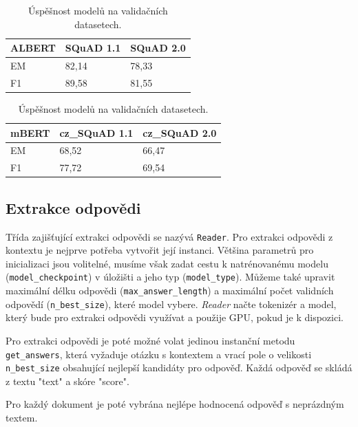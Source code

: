 \begin{table}[h]
\centering
    \begin{tabular}{| l | l | l |}
        \hline
        \textbf{ALBERT} & SQuAD 1.1 & SQuAD 2.0 \\ \hline
        EM              & 82,14      & 78,33      \\ \hline
        F1              & 89,58      & 81,55      \\ \hline
    \end{tabular}
    \begin{tabular}{| l | l | l |}
        \hline
        \textbf{mBERT} & cz\_SQuAD 1.1 & cz\_SQuAD 2.0 \\ \hline
        EM              & 68,52      & 66,47      \\ \hline
        F1              & 77,72      & 69,54      \\ \hline
    \end{tabular}
    \caption{
    Úspěšnost modelů na validačních datasetech.
    }
    \label{tab:reader_trained}
\end{table}

\subsection{Extrakce odpovědi}
Třída zajišťující extrakci odpovědi se nazývá \texttt{Reader}. Pro extrakci odpovědi z kontextu je nejprve potřeba vytvořit její instanci. Většina parametrů pro inicializaci jsou volitelné, musíme však zadat cestu k natrénovanému modelu (\texttt{model\_checkpoint}) v úložišti a jeho typ (\texttt{model\_type}). Můžeme také upravit maximální délku odpovědi (\texttt{max\_answer\_length}) a maximální počet validních odpovědí (\texttt{n\_best\_size}), které model vybere. \emph{Reader} načte tokenizér a model, který bude pro extrakci odpovědi využívat a použije GPU, pokud je k dispozici.\par
Pro extrakci odpovědi je poté možné volat jedinou instanční metodu \texttt{get\_answers}, která vyžaduje otázku s kontextem a vrací pole o velikosti \texttt{n\_best\_size} obsahující nejlepší kandidáty pro odpověď. Každá odpověď se skládá z textu "text" a skóre "score".\par
Pro každý dokument je poté vybrána nejlépe hodnocená odpověď s neprázdným textem.


